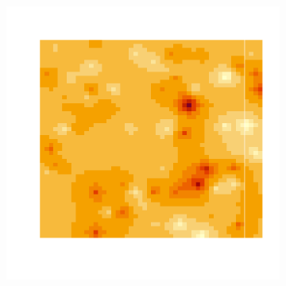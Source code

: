 \documentclass[10pt]{article} %
\begin{document}
\begin{figure}[h!]
\begin{subfigure}[b]{0.3\textwidth}
        \label{fig:three sin x}
    \end{subfigure}
    \hfill
    \begin{subfigure}[b]{0.3\textwidth}
        \centering
        \includegraphics[width=\textwidth]{media/gauss_inter_1.png}
        \label{fig:five over x}
    \end{subfigure}
       \label{fig:three graphs}
\end{figure}
\vspace{-1.5cm}
\end{document}
